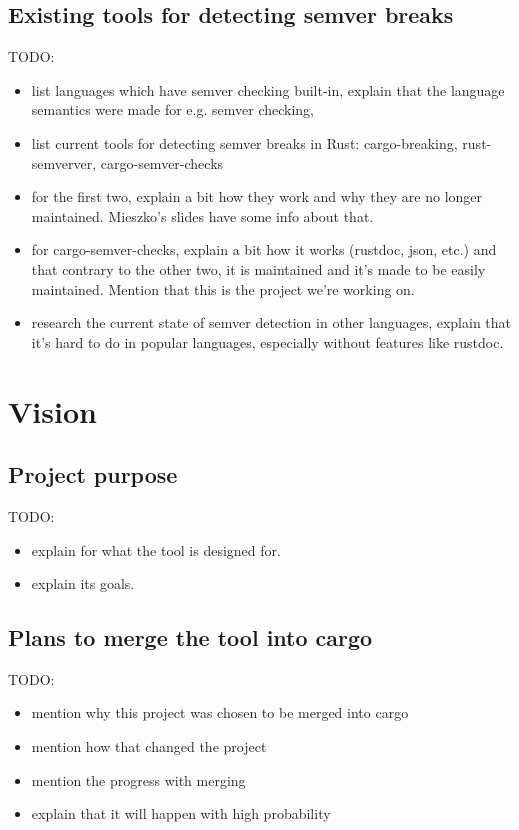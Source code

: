 \documentclass[licencjacka,en]{pracamgr}
\begin{document}
\section{Existing tools for detecting semver breaks}

TODO:
\begin{itemize}
	\item list languages which have semver checking built-in,
		explain that the language semantics were made for e.g. semver checking,
	\item list current tools for detecting semver breaks in Rust:
		cargo-breaking, rust-semverver, cargo-semver-checks
	\item for the first two, explain a bit how they work and why they are no longer maintained.
		Mieszko's slides have some info about that.
	\item for cargo-semver-checks, explain a bit how it works (rustdoc, json, etc.)
		and that contrary to the other two, it is maintained and it's made to be easily maintained.
		Mention that this is the project we're working on.
	\item research the current state of semver detection in other languages,
		explain that it's hard to do in popular languages,
		especially without features like rustdoc.
\end{itemize}


\chapter{Vision}\label{r:chapter_vision}

\section{Project purpose}

TODO:
\begin{itemize}
	\item explain for what the tool is designed for.
	\item explain its goals.
\end{itemize}

\section{Plans to merge the tool into cargo}

TODO:
\begin{itemize}
	\item mention why this project was chosen to be merged into cargo
	\item mention how that changed the project
	\item mention the progress with merging
	\item explain that it will happen with high probability
\end{itemize}
\end{document}

